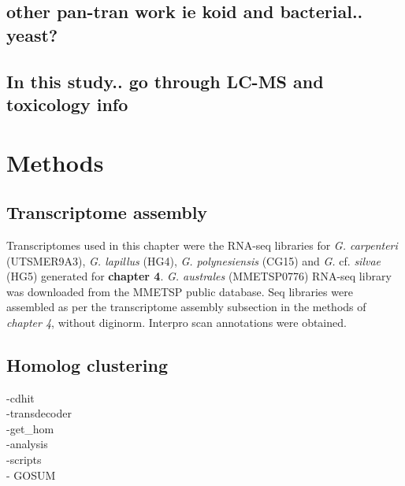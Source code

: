 \documentclass[12pt]{article}
\begin{document}
\subsection*{other pan-tran work ie koid and bacterial.. yeast?}

\subsection*{In this study.. go through LC-MS and toxicology info}

\newpage
\section*{Methods}
\subsection*{Transcriptome assembly}
Transcriptomes used in this chapter were the RNA-seq libraries for \textit{G. carpenteri} (UTSMER9A3), \textit{G. lapillus} (HG4), \textit{G. polynesiensis} (CG15) and \textit{G.} cf. \textit{silvae} (HG5) generated for \textbf{chapter 4}. 
\textit{G. australes} (MMETSP0776) RNA-seq library was downloaded from the MMETSP public database. 
Seq libraries were assembled as per the transcriptome assembly subsection in the methods of \textit{chapter 4}, without diginorm. 
Interpro scan annotations were obtained.

\subsection*{Homolog clustering}
-cdhit\\
-transdecoder\\
-get\_hom \\
-analysis \\
-scripts \\
- GOSUM
\end{document}
